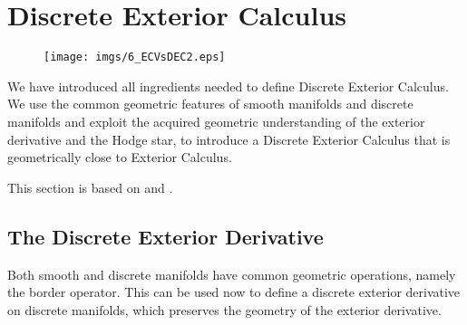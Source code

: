 


\newpage
\section{Discrete Exterior Calculus}
\label{sec:EC_DEC}

\begin{figure}[h]%
\begin{center}
\texttt{[image: imgs/6\_ECVsDEC2.eps]}%
\end{center}
\end{figure}
\noindent  We have introduced all ingredients needed  to define Discrete Exterior Calculus. We use the common geometric features of smooth manifolds and discrete manifolds  and exploit the acquired  geometric understanding of the exterior derivative and the Hodge star, to introduce a Discrete Exterior Calculus that is geometrically close to Exterior Calculus.

This section is based on \cite{hirani03} and \cite{DMK08}.


\subsection{The Discrete Exterior Derivative}
Both smooth and discrete manifolds have common geometric operations, namely the border operator. This can be used now to define a discrete exterior derivative on discrete manifolds, which preserves the geometry of the exterior derivative. 

